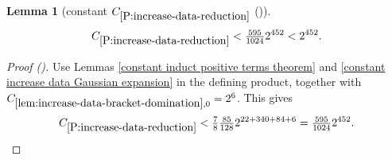\documentclass[12pt,reqno]{amsart}
\newcommand{\auto}{{({\tiny\faCar})}}
\theoremstyle{plain}
\newtheorem{lemma}[theorem]{Lemma}
\numberwithin{equation}{section}
\theoremstyle{remark}
\newcommand{\using}[1]{}
\begin{document}
\begin{lemma}[constant $C_{\ref{P:increase-data-reduction}}$ \auto]\label{constant increase data reduction}\using{constant induct positive terms theorem}\using{constant increase data Gaussian expansion}\using{lem:increase-data-bracket-domination}\using{P:increase-data-reduction}
\begin{equation}\label{constant increase data reduction bound}
C_{\ref{P:increase-data-reduction}}
<\tfrac{595}{1024}2^{452}<2^{452}.
\end{equation}
\end{lemma}
\begin{proof}[Proof \auto]
Use Lemmas \ref{constant induct positive terms theorem} and \ref{constant increase data Gaussian expansion} in the defining product, together with $C_{\ref{lem:increase-data-bracket-domination},0}=2^6$. This gives
\[
C_{\ref{P:increase-data-reduction}}
<\tfrac78\tfrac{85}{128}2^{22+340+84+6}
=\tfrac{595}{1024}2^{452}.
\]
\end{proof}
\end{document}

